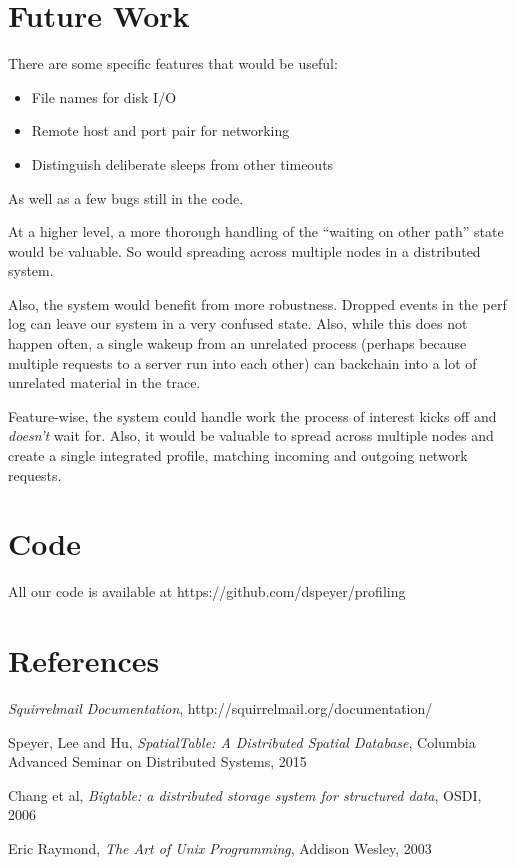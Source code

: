\documentclass[10pt]{article}
\begin{document}
\section{Future Work}

There are some specific features that would be useful:

\begin{itemize}
\item File names for disk I/O
\item Remote host and port pair for networking
\item Distinguish deliberate sleeps from other timeouts
\end{itemize}

As well as a few bugs still in the code.

At a higher level, a more thorough handling of the ``waiting on other path'' state would be valuable.  So would spreading across multiple nodes in a distributed system.

Also, the system would benefit from more robustness.  Dropped events in the perf log can leave our system in a very confused state.  Also, while this does not happen often, a single wakeup from an unrelated process (perhaps because multiple requests to a server run into each other) can backchain into a lot of unrelated material in the trace.

Feature-wise, the system could handle work the process of interest kicks off and \emph{doesn't} wait for.  Also, it would be valuable to spread across multiple nodes and create a single integrated profile, matching incoming and outgoing network requests.

\section{Code}

All our code is available at https://github.com/dspeyer/profiling

\section{References}

\begin{thebibliography}{9}

  \emph{Squirrelmail Documentation},
  http://squirrelmail.org/documentation/

  Speyer, Lee and Hu,
  \emph{SpatialTable: A Distributed Spatial Database},
  Columbia Advanced Seminar on Distributed Systems,
  2015

  Chang et al,
  \emph{Bigtable: a distributed storage system for structured data},
  OSDI,
  2006

  Eric Raymond,
  \emph{The Art of Unix Programming},
  Addison Wesley,
  2003


\end{thebibliography}
\end{document}
